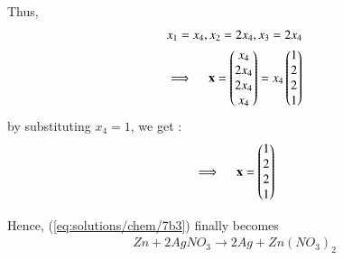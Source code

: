 Thus,
\begin{align}
    x_1 = x_4, x_ 2 = 2x_4, x_3 = 2x_4\\
    \implies \quad\mathbf{x } = \begin{pmatrix}x_{4} \\ 2x_{4}\\ 2x_{4} \\ x_{4}\end{pmatrix}   =  x_4 \begin{pmatrix}1\\ 2 \\ 2 \\1\end{pmatrix}
    \end{align} 
by substituting $x_4= 1$, we get :
\begin{align}
 \implies \quad\mathbf{x} = \begin{pmatrix}1\\ 2 \\ 2 \\1\end{pmatrix}
\end{align}

Hence, (\ref{eq:solutions/chem/7b3}) finally becomes
\begin{align}
Zn + 2AgNO_{3} \to 2Ag + Zn(NO_{3})_{2}
\end{align}

